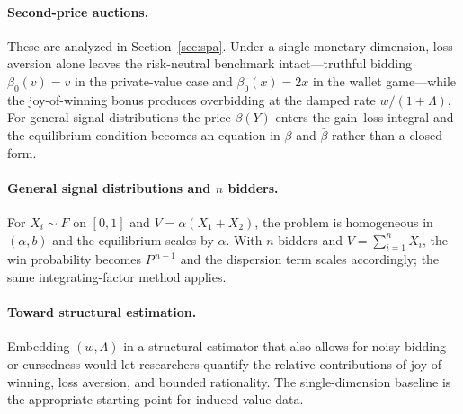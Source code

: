 \documentclass[11pt,a4paper]{article}
\theoremstyle{remark}
\begin{document}
\paragraph{Second-price auctions.}
These are analyzed in Section~\ref{sec:spa}. Under a single monetary dimension, loss
aversion alone leaves the risk-neutral benchmark intact---truthful bidding
$\beta_0(v)=v$ in the private-value case and $\beta_0(x)=2x$ in the wallet game---while
the joy-of-winning bonus produces overbidding at the damped rate $w/(1+\Lambda)$. For
general signal distributions the price $\beta(Y)$ enters the gain--loss integral and
the equilibrium condition becomes an equation in $\beta$ and $\bar\beta$ rather than a
closed form.
\paragraph{General signal distributions and $n$ bidders.}
For $X_i\sim F$ on $[0,1]$ and $V=\alpha(X_1+X_2)$, the problem is homogeneous in
$(\alpha,b)$ and the equilibrium scales by $\alpha$. With $n$ bidders and
$V=\sum_{i=1}^{n}X_i$, the win probability becomes $P^{\,n-1}$ and the dispersion
term scales accordingly; the same integrating-factor method applies.
\paragraph{Toward structural estimation.}
Embedding $(w,\Lambda)$ in a structural estimator that also allows for noisy bidding
\citep{goeree2002} or cursedness \citep{eysterRabin2005} would let researchers
quantify the relative contributions of joy of winning, loss aversion, and bounded
rationality. The single-dimension baseline is the appropriate starting point for
induced-value data.
\appendix
\end{document}
